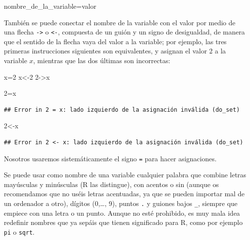 \documentclass[
]{book}
\newenvironment{Shaded}{\begin{snugshade}}{\end{snugshade}}
\newcommand{\DecValTok}[1]{\textcolor[rgb]{0.00,0.00,0.81}{#1}}
\newcommand{\NormalTok}[1]{#1}
\theoremstyle{definition}
\theoremstyle{definition}
\theoremstyle{definition}
\theoremstyle{remark}
\begin{document}
\begin{Shaded}
\begin{Highlighting}[]
\NormalTok{nombre\_de\_la\_variable=valor}
\end{Highlighting}
\end{Shaded}

También se puede conectar el nombre de la variable con el valor por medio de una flecha \texttt{-\textgreater{}} o \texttt{\textless{}-}, compuesta de un guión y un signo de desigualdad, de manera que el sentido de la flecha vaya del valor a la variable; por ejemplo, las tres primeras instrucciones siguientes son equivalentes, y asignan el valor 2 a la variable \(x\), mientras que las dos últimas son incorrectas:

\begin{Shaded}
\begin{Highlighting}[]
\NormalTok{x=}\DecValTok{2}
\NormalTok{x\textless{}{-}}\DecValTok{2}
\DecValTok{2}\NormalTok{{-}\textgreater{}x}
\end{Highlighting}
\end{Shaded}

\begin{Shaded}
\begin{Highlighting}[]
\DecValTok{2}\NormalTok{=x}
\end{Highlighting}
\end{Shaded}

\begin{verbatim}
## Error in 2 = x: lado izquierdo de la asignación inválida (do_set)
\end{verbatim}

\begin{Shaded}
\begin{Highlighting}[]
\DecValTok{2}\NormalTok{\textless{}{-}x}
\end{Highlighting}
\end{Shaded}

\begin{verbatim}
## Error in 2 <- x: lado izquierdo de la asignación inválida (do_set)
\end{verbatim}

Nosotros usaremos sistemáticamente el signo \texttt{=} para hacer asignaciones.

Se puede usar como nombre de una variable cualquier palabra que combine letras mayúsculas y minúsculas (R las distingue), con acentos o sin (aunque os recomendamos que no uséis letras acentuadas, ya que se pueden importar mal de un ordenador a otro), dígitos (0,\ldots, 9), puntos \texttt{.} y guiones bajos \texttt{\_}, siempre que empiece con una letra o un punto. Aunque no esté prohibido, es muy mala idea redefinir nombres que ya sepáis que tienen significado para R, como por ejemplo \texttt{pi} o \texttt{sqrt}.
\end{document}
